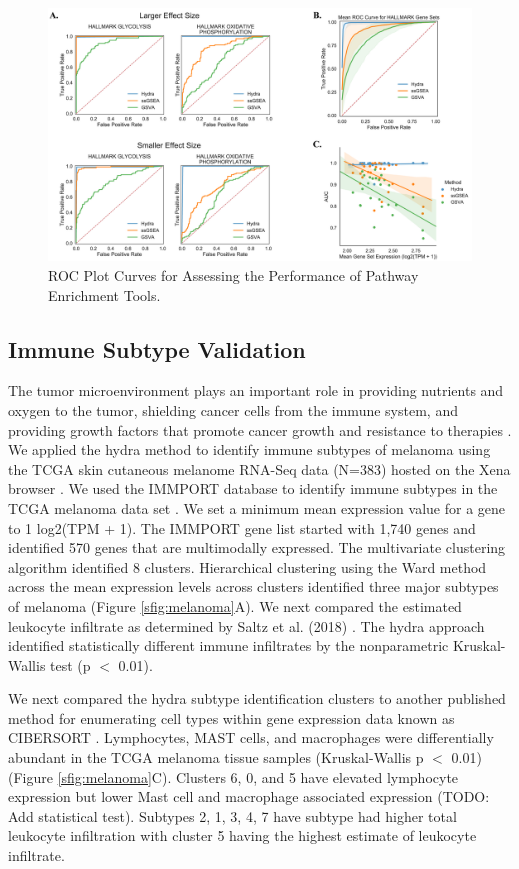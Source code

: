 \documentclass[fleqn,10pt]{wlscirep}
\begin{document}

\begin{figure}
	\centering
	\includegraphics[width=0.8\linewidth]{images/figure-2-roc-curves@2x.png}
	\caption{ROC Plot Curves for Assessing the Performance of Pathway Enrichment Tools.}
	\label{sfig:rocplot}
\end{figure}

\subsection*{Immune Subtype Validation}
The tumor microenvironment plays an important role in providing nutrients and oxygen to the tumor, shielding cancer cells from the immune system, and providing growth factors that promote cancer growth and resistance to therapies \cite{hanahan2012accessories}. We applied the hydra method to identify immune subtypes of melanoma using the TCGA skin cutaneous melanome RNA-Seq data (N=383) hosted on the Xena browser \cite{vivian2017toil}. We used the IMMPORT database to identify immune subtypes in the TCGA melanoma data set \cite{bhattacharya2018immport}. We set a minimum mean expression value for a gene to 1 log2(TPM + 1). The IMMPORT gene list started with 1,740 genes and identified 570 genes that are multimodally expressed. The multivariate clustering algorithm identified 8 clusters. Hierarchical clustering using the Ward method across the mean expression levels across clusters identified three major subtypes of melanoma (Figure \ref{sfig:melanoma}A). We next compared the estimated leukocyte infiltrate as determined by Saltz et al. (2018) \cite{saltz2018spatial}. The hydra approach identified statistically different immune infiltrates by the nonparametric Kruskal-Wallis test (p $<$ 0.01).

We next compared the hydra subtype identification clusters to another published method for enumerating cell types within gene expression data known as CIBERSORT \cite{newman2015robust}. Lymphocytes, MAST cells, and macrophages were differentially abundant in the TCGA melanoma tissue samples (Kruskal-Wallis p $<$ 0.01) (Figure \ref{sfig:melanoma}C). Clusters 6, 0, and 5 have elevated lymphocyte expression but lower Mast cell and macrophage associated expression (TODO: Add statistical test). Subtypes 2, 1, 3, 4, 7 have subtype had higher total leukocyte infiltration with cluster 5 having the highest estimate of leukocyte infiltrate.
\end{document}

